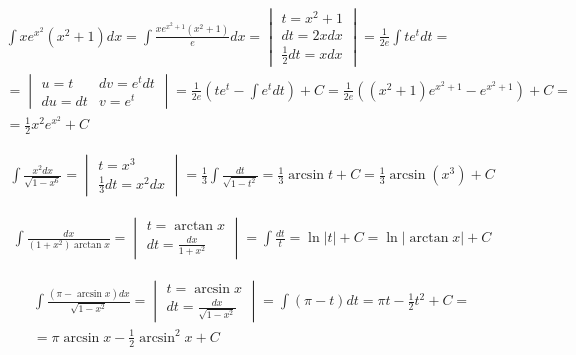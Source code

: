 \begin{gather*}
  \int xe^{x^2}(x^2+1)dx
  = \int \frac{xe^{x^2+1}(x^2+1)}{e}dx =
  \begin{vmatrix}
    t=x^2+1 \\
    dt=2xdx \\
    \frac{1}{2}dt=xdx
  \end{vmatrix}
  = \frac{1}{2e} \int te^t dt = \\
  = \begin{vmatrix}
    u=t & dv=e^tdt \\
    du=dt & v=e^t
  \end{vmatrix}
  = \frac{1}{2e} \left( te^t - \int e^tdt\right) +C
  = \frac{1}{2e}\left((x^2+1)e^{x^2+1}-e^{x^2+1}\right)+C = \\
  = \frac{1}{2}x^2e^{x^2}+C
\end{gather*}


\begin{gather*}
  \int \frac{x^2dx}{\sqrt{1-x^6}} =
  \begin{vmatrix}
    t=x^3 \\
    \frac{1}{3}dt=x^2dx
  \end{vmatrix}
  = \frac{1}{3}\int \frac{dt}{\sqrt{1-t^2}}
  = \frac{1}{3} \arcsin t + C
  = \frac{1}{3} \arcsin (x^3)+C
\end{gather*}


\begin{gather*}
  \int \frac{dx}{(1+x^2)\arctan x} =
  \begin{vmatrix}
    t=\arctan x \\
    dt=\frac{dx}{1+x^2}
  \end{vmatrix}
  = \int \frac{dt}{t}
  = \ln|t|+C
  = \ln|\arctan x|+C
\end{gather*}


\begin{gather*}
  \int \frac{(\pi -\arcsin x)dx}{\sqrt{1-x^2}} =
  \begin{vmatrix}
    t=\arcsin x \\
    dt=\frac{dx}{\sqrt{1-x^2}}
  \end{vmatrix}
  = \int (\pi - t)dt
  = \pi t - \frac{1}{2}t^2 + C = \\
  = \pi \arcsin x - \frac{1}{2}\arcsin^2 x+C
\end{gather*}


